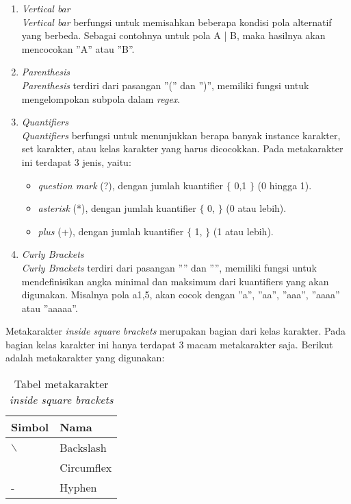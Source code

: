 \begin{enumerate}
	\item \textit{Vertical bar} \\
	\textit{Vertical bar} berfungsi untuk memisahkan beberapa kondisi pola alternatif yang berbeda. Sebagai contohnya untuk pola A | B, maka hasilnya akan mencocokan ''A'' atau ''B''.
	
	\item \textit{Parenthesis} \\
	\textit{Parenthesis} terdiri dari pasangan ''('' dan '')'', memiliki fungsi untuk mengelompokan subpola dalam \textit{regex}.	
	
	\item \textit{Quantifiers} \\
	\textit{Quantifiers} berfungsi untuk menunjukkan berapa banyak instance karakter, set karakter, atau kelas karakter yang harus dicocokkan. Pada metakarakter ini terdapat 3 jenis, yaitu:
	\begin{itemize}
		\item \textit{question mark} (?), dengan jumlah kuantifier $\lbrace$ 0,1 $\rbrace$ (0 hingga 1).
		\item \textit{asterisk} (*), dengan jumlah kuantifier $\lbrace$ 0, $\rbrace$ (0 atau lebih). 
		\item \textit{plus} (+), dengan jumlah kuantifier $\lbrace$ 1, $\rbrace$ (1 atau lebih). 
	\end{itemize}	 

	\item \textit{Curly Brackets} \\
	\textit{Curly Brackets} terdiri dari pasangan ''{'' dan ''}'', memiliki fungsi untuk mendefinisikan angka minimal dan maksimum dari kuantifiers yang akan digunakan. Misalnya pola a{1,5}, akan cocok dengan ''a'', ''aa'', ''aaa'', ''aaaa'' atau ''aaaaa''.
	
\end{enumerate}
		
Metakarakter \textit{inside square brackets} merupakan bagian dari kelas karakter. Pada bagian kelas  karakter ini hanya terdapat 3 macam metakarakter saja. Berikut adalah metakarakter yang digunakan:
		
\begin{table}[H]
	\caption {Tabel metakarakter \textit{inside square brackets}} \label{tab:metacharacters-inside}
	\begin{center}
		\begin{tabular}{|p{1.5cm} |p{2.5cm}|}
		\hline 
		Simbol & Nama \\ 
		\hline 
		$\backslash$ & Backslash \\ 
		\hline 
		$\hat{}$ & Circumflex \\ 
		\hline 
		- & Hyphen \\ 
		\hline
		\end{tabular}
	\end{center}
\end{table}

